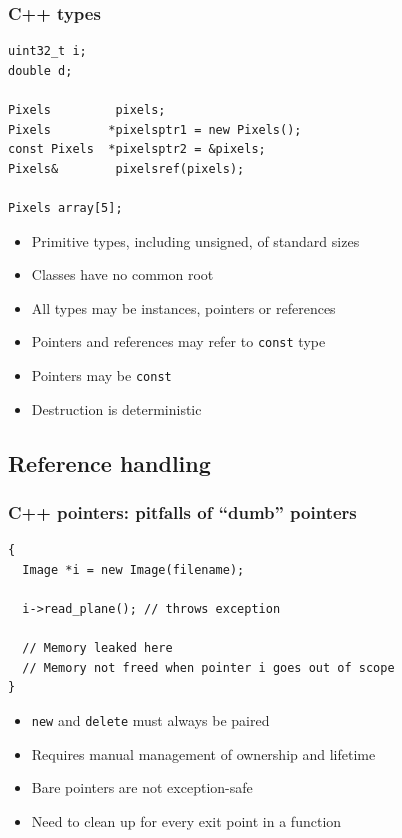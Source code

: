 \documentclass{beamer}
\begin{document}
\begin{frame}[fragile]
  \frametitle{C++ types}
  \begin{lstlisting}
uint32_t i;
double d;

Pixels         pixels;
Pixels        *pixelsptr1 = new Pixels();
const Pixels  *pixelsptr2 = &pixels;
Pixels&        pixelsref(pixels);

Pixels array[5];
\end{lstlisting}
  \begin{itemize}
  \item Primitive types, including unsigned, of standard sizes
  \item Classes have no common root
  \item All types may be instances, pointers or references
  \item Pointers and references may refer to \texttt{const} type
  \item Pointers may be \texttt{const}
  \item Destruction is deterministic
  \end{itemize}
\end{frame}

\subsection{Reference handling}

\begin{frame}[fragile]
  \frametitle{C++ pointers: pitfalls of “dumb” pointers}
  \begin{lstlisting}
{
  Image *i = new Image(filename);

  i->read_plane(); // throws exception

  // Memory leaked here
  // Memory not freed when pointer i goes out of scope
}
\end{lstlisting}
  \begin{itemize}
    \item \texttt{new} and \texttt{delete} must always be paired
    \item Requires manual management of ownership and lifetime
    \item Bare pointers are not exception-safe
    \item Need to clean up for every exit point in a function
  \end{itemize}
\end{frame}
\end{document}
